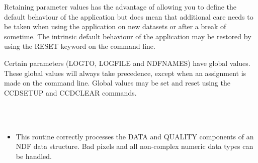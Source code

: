 \documentclass[twoside,11pt]{article}
\newcommand{\htmlref}[2]{#1}
\renewcommand{\_}{\texttt{\symbol{95}}}
\newcommand{\xroutine}[1]{\htmlref{{\sc #1}}{#1}}
\newcommand{\sstimplementationstatus}[1]{
   \item[{Implementation Status:}] \mbox{} \\[1.3ex] #1}
\newcommand{\sstitemlist}[1]{
  \mbox{} \\
  \vspace{-3.5ex}
  \begin{itemize}
     #1
  \end{itemize}
}
\newcommand{\sstitem}{\item}
\newcommand{\sstimplementationstatus}[1]{
      \item[Implementation Status:] #1
   }
\newcommand{\sstitemlist}[1]{
      \begin{itemize}
         #1
      \end{itemize}
      \\
   }
\newcommand{\sstitem}{\item}
\begin{document}
{{      Retaining parameter values has the advantage of allowing you to
      define the default behaviour of the application but does mean
      that additional care needs to be taken when using the application
      on new datasets or after a break of sometime.  The intrinsic
      default behaviour of the application may be restored by using the
      RESET keyword on the command line.

      Certain parameters (LOGTO, LOGFILE and NDFNAMES) have global
      values. These global values will always take precedence, except
      when an assignment is made on the command line.  Global values may
      be set and reset using the \xroutine{CCDSETUP} and \xroutine{CCDCLEAR} commands.
   }
   \sstimplementationstatus{
      \sstitemlist{

         \sstitem
         This routine correctly processes the DATA and QUALITY components
           of an NDF data structure. Bad pixels and all non-complex numeric
           data types can be handled.
      }
   }
}
\end{document}

